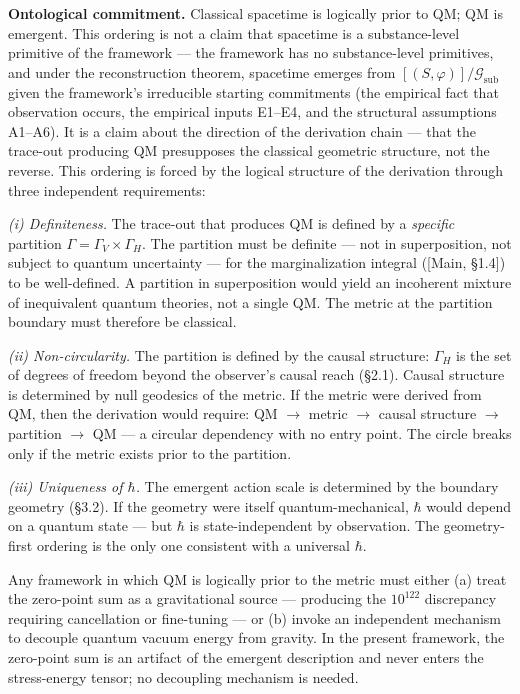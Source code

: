 \documentclass[
]{article}
\begin{document}
\textbf{Ontological commitment.} Classical spacetime is logically prior
to QM; QM is emergent. This ordering is not a claim that spacetime is a
substance-level primitive of the framework --- the framework has no
substance-level primitives, and under the reconstruction theorem,
spacetime emerges from \([(S, \varphi)]/\mathcal{G}_{\text{sub}}\) given
the framework's irreducible starting commitments (the empirical fact
that observation occurs, the empirical inputs E1--E4, and the structural
assumptions A1--A6). It is a claim about the direction of the derivation
chain --- that the trace-out producing QM presupposes the classical
geometric structure, not the reverse. This ordering is forced by the
logical structure of the derivation through three independent
requirements:

\emph{(i) Definiteness.} The trace-out that produces QM is defined by a
\emph{specific} partition \(\Gamma = \Gamma_V \times \Gamma_H\). The
partition must be definite --- not in superposition, not subject to
quantum uncertainty --- for the marginalization integral ({[}Main,
§1.4{]}) to be well-defined. A partition in superposition would yield an
incoherent mixture of inequivalent quantum theories, not a single QM.
The metric at the partition boundary must therefore be classical.

\emph{(ii) Non-circularity.} The partition is defined by the causal
structure: \(\Gamma_H\) is the set of degrees of freedom beyond the
observer's causal reach (§2.1). Causal structure is determined by null
geodesics of the metric. If the metric were derived from QM, then the
derivation would require: QM \(\to\) metric \(\to\) causal structure
\(\to\) partition \(\to\) QM --- a circular dependency with no entry
point. The circle breaks only if the metric exists prior to the
partition.

\emph{(iii) Uniqueness of \(\hbar\).} The emergent action scale is
determined by the boundary geometry (§3.2). If the geometry were itself
quantum-mechanical, \(\hbar\) would depend on a quantum state --- but
\(\hbar\) is state-independent by observation. The geometry-first
ordering is the only one consistent with a universal \(\hbar\).

Any framework in which QM is logically prior to the metric must either
(a) treat the zero-point sum as a gravitational source --- producing the
\(10^{122}\) discrepancy requiring cancellation or fine-tuning --- or
(b) invoke an independent mechanism to decouple quantum vacuum energy
from gravity. In the present framework, the zero-point sum is an
artifact of the emergent description and never enters the stress-energy
tensor; no decoupling mechanism is needed.
\end{document}
